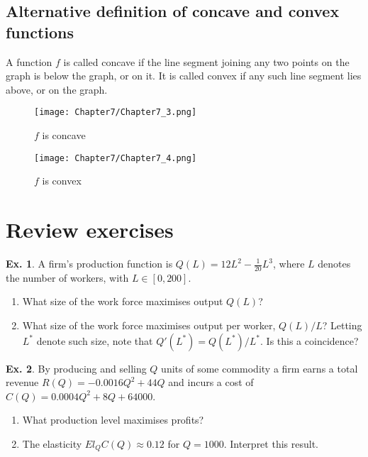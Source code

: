 \documentclass[10pt,a4paper]{book}
\theoremstyle{definition}\newtheorem{definition}{Definition}
\theoremstyle{definition}\newtheorem{fact}{Fact}
\theoremstyle{definition}\newtheorem{ex}{Ex.}
\theoremstyle{definition}\newtheorem{project}{Project}
\theoremstyle{definition}\newtheorem{problem}{Problem}
\theoremstyle{definition}\newtheorem{example}{Example}
\numberwithin{theorem}{chapter}
\numberwithin{corollary}{chapter}
\numberwithin{assumption}{chapter}
\numberwithin{definition}{chapter}
\numberwithin{prop}{chapter}
\numberwithin{notation}{chapter}
\numberwithin{problem}{chapter}
\numberwithin{example}{chapter}
\numberwithin{fact}{chapter}
\numberwithin{ex}{chapter}
\begin{document}
	\subsection{Alternative definition of concave and convex functions}
	
	A function $f$ is called concave if the line segment joining any two points on the graph is below the graph, or on it. It is called convex if any such line segment lies above, or on the graph.
	
	\begin{figure}[H]
		\centering
		\texttt{[image: Chapter7/Chapter7\_3.png]}
		\caption{$f$ is concave}
	\end{figure}
	
	\begin{figure}[H]
		\centering
		\texttt{[image: Chapter7/Chapter7\_4.png]}
		\caption{$f$ is convex}
	\end{figure}
	
	\section{Review exercises}
	
	\begin{ex}
		A firm’s production function is $Q(L) = 12L^2 - \frac{1}{20} L^3$, where $L$ denotes the number of workers, with $L \in [0, 200]$.
		\begin{enumerate}[label=(\alph*)]
			\item What size of the work force maximises output $Q(L)$?
			\item What size of the work force maximises output per worker, $Q(L)/L$? Letting $L^{*}$ denote such size, note that $Q'(L^{*}) = Q(L^{*})/L^{*}$. Is this a coincidence?
		\end{enumerate}
	\end{ex}
	
	\begin{ex}
		By producing and selling $Q$ units of some commodity a firm earns a total revenue $R(Q) = -0.0016Q^2 + 44Q$ and incurs a cost of $C(Q) = 0.0004Q^2 + 8Q + 64 000$.
		\begin{enumerate}[label=(\alph*)]
			\item What production level maximises profits?
			\item The elasticity $El_Q C(Q) \approx 0.12$ for $Q = 1000$. Interpret this result.
		\end{enumerate}
	\end{ex}
	
\end{document}
